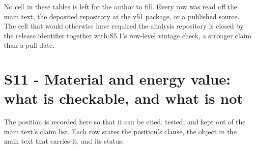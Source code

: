 \documentclass[11pt]{article}
\begin{document}
No cell in these tables is left for the author to fill. Every row was read off the main text, the deposited repository at the v51 package, or a published source. The cell that would otherwise have required the analysis repository is closed by the release identifier together with S5.1's row-level vintage check, a stronger claim than a pull date.

\section*{S11 - Material and energy value: what is checkable, and what is not}\label{s11---material-and-energy-value-what-is-checkable-and-what-is-not}

The position is recorded here so that it can be cited, tested, and kept out of the main text's claim list. Each row states the position's clause, the object in the main text that carries it, and its status.
\end{document}

